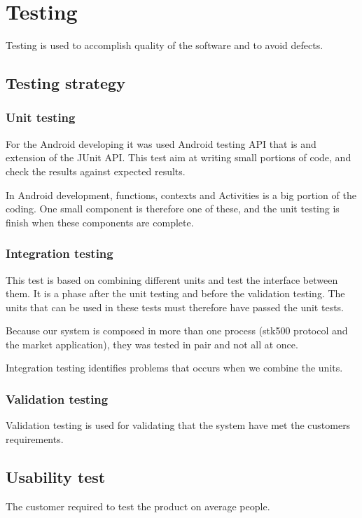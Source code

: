 \chapter{Testing}
	Testing is used to accomplish quality of the software and to avoid defects.
	
	\section{Testing strategy}
		\subsection{Unit testing}
			For the Android developing it was used Android testing API that is and extension of the JUnit API.
			This test aim at writing small portions of code, and check the results against expected results.

			In Android development, functions, contexts and Activities is a big portion of the coding.
			One small component is therefore one of these, and the unit testing is finish when these components are complete.

		\subsection{Integration testing}
			This test is based on combining different units and test the interface between them. It is a phase after the unit testing and before the validation testing. The units that can be used in these tests must therefore have passed the unit tests.

			Because our system is composed in more than one process (stk500 protocol and the market application), they 
			was tested in pair and not all at once.

			Integration testing identifies problems that occurs when we combine the units.

		\subsection{Validation testing}
			Validation testing is used for validating that the system have met the customers requirements.

	\section{Usability test}
		The customer required to test the product on average people.